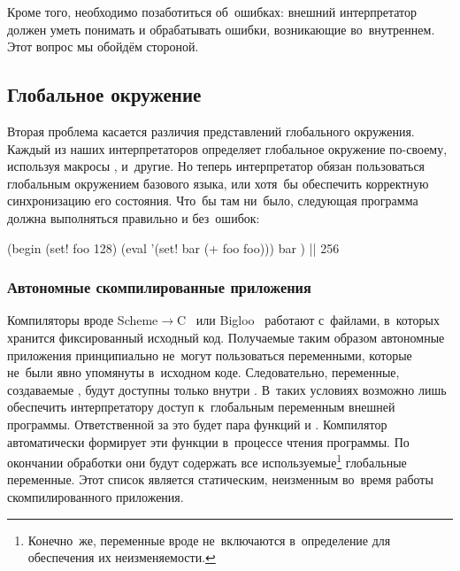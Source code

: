 Кроме того, необходимо позаботиться об~ошибках: внешний интерпретатор должен
уметь понимать и обрабатывать ошибки, возникающие во~внутреннем. Этот вопрос
мы обойдём стороной.


\subsection{Глобальное окружение}%
\label{reflection/interpreted-eval/ssect:global}

Вторая проблема касается различия представлений глобального окружения. Каждый из
наших интерпретаторов определяет глобальное окружение по-своему, используя
макросы ,  и~другие. Но теперь интерпретатор
обязан пользоваться глобальным окружением базового языка, или хотя~бы обеспечить
корректную синхронизацию его состояния. Что~бы там ни~было, следующая программа
должна выполняться правильно и без~ошибок:

\begin{code:lisp}
(begin (set! foo 128)
       (eval '(set! bar (+ foo foo)))
       bar )                          |\is| 256
\end{code:lisp}


\subsubsection{Автономные скомпилированные приложения}%
\label{reflection/interpreted-eval/global/sssect:autonomous}

Компиляторы вроде Scheme$\to$C~\cite{bar89} или Bigloo~\cite{ser94} работают
с~файлами, в~которых хранится фиксированный исходный код. Получаемые таким
образом автономные приложения принципиально не~могут пользоваться переменными,
которые не~были явно упомянуты в~исходном коде. Следовательно, переменные,
создаваемые , будут доступны только внутри . В~таких условиях
возможно лишь обеспечить интерпретатору доступ к~глобальным переменным внешней
программы. Ответственной за это будет пара функций  и
. Компилятор автоматически формирует эти функции
в~процессе чтения программы.  По окончании
обработки они будут содержать все используемые\footnote{Конечно~же, переменные
вроде  не~включаются в~определение  для
обеспечения их неизменяемости.} глобальные переменные. Этот список является
статическим, неизменным во~время работы скомпилированного приложения.

